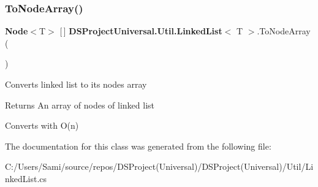 \subsubsection{To\+Node\+Array()}
{\footnotesize\ttfamily \textbf{ Node}$<$T$>$ [$\,$] \textbf{ D\+S\+Project\+Universal.\+Util.\+Linked\+List}$<$ T $>$.To\+Node\+Array (\begin{DoxyParamCaption}{ }\end{DoxyParamCaption})}



Converts linked list to its node\textquotesingle{}s array

\begin{DoxyReturn}{Returns}
An array of nodes of linked list
\end{DoxyReturn}


Converts with O(n)

The documentation for this class was generated from the following file\+:\begin{DoxyCompactItemize}
\item 
C\+:/\+Users/\+Sami/source/repos/\+D\+S\+Project(\+Universal)/\+D\+S\+Project(\+Universal)/\+Util/Linked\+List.\+cs\end{DoxyCompactItemize}
